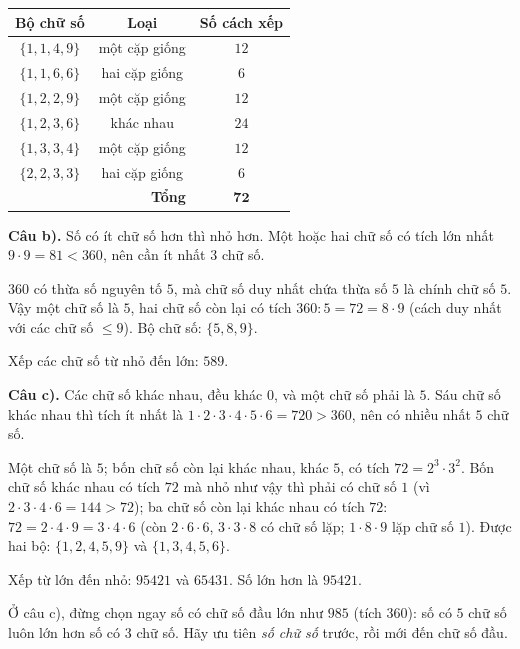 {
\begin{center}
\begin{tabular}{|c|c|c|}
\hline
\rowcolor{Tint}Bộ chữ số & Loại & Số cách xếp\\
\hline
$\{1,1,4,9\}$ & một cặp giống & $12$\\
$\{1,1,6,6\}$ & hai cặp giống & $6$\\
$\{1,2,2,9\}$ & một cặp giống & $12$\\
$\{1,2,3,6\}$ & khác nhau & $24$\\
$\{1,3,3,4\}$ & một cặp giống & $12$\\
$\{2,2,3,3\}$ & hai cặp giống & $6$\\
\hline
\multicolumn{2}{|r|}{\textbf{Tổng}} & $\mathbf{72}$\\
\hline
\end{tabular}
\end{center}

\par\smallskip\textbf{Câu b).}
Số có ít chữ số hơn thì nhỏ hơn. Một hoặc hai chữ số có tích lớn nhất $9\cdot 9=81<360$, nên cần ít nhất $3$ chữ số.

$360$ có thừa số nguyên tố $5$, mà chữ số duy nhất chứa thừa số $5$ là chính chữ số $5$. Vậy một chữ số là $5$, hai chữ số còn lại có tích $360:5=72=8\cdot 9$ (cách duy nhất với các chữ số $\le 9$). Bộ chữ số: $\{5,8,9\}$.

Xếp các chữ số từ nhỏ đến lớn: $589$.

\par\smallskip\textbf{Câu c).}
Các chữ số khác nhau, đều khác $0$, và một chữ số phải là $5$. Sáu chữ số khác nhau thì tích ít nhất là $1\cdot2\cdot3\cdot4\cdot5\cdot6=720>360$, nên có nhiều nhất $5$ chữ số.

Một chữ số là $5$; bốn chữ số còn lại khác nhau, khác $5$, có tích $72=2^3\cdot 3^2$. Bốn chữ số khác nhau có tích $72$ mà nhỏ như vậy thì phải có chữ số $1$ (vì $2\cdot3\cdot4\cdot6=144>72$); ba chữ số còn lại khác nhau có tích $72$: $72=2\cdot4\cdot9=3\cdot4\cdot6$ (còn $2\cdot 6\cdot 6$, $3\cdot 3\cdot 8$ có chữ số lặp; $1\cdot 8\cdot 9$ lặp chữ số $1$). Được hai bộ: $\{1,2,4,5,9\}$ và $\{1,3,4,5,6\}$.

Xếp từ lớn đến nhỏ: $95421$ và $65431$. Số lớn hơn là $95421$.

\begin{warnbox}Ở câu c), đừng chọn ngay số có chữ số đầu lớn như $985$ (tích $360$): số có $5$ chữ số luôn lớn hơn số có $3$ chữ số. Hãy ưu tiên \emph{số chữ số} trước, rồi mới đến chữ số đầu.\end{warnbox}

}

